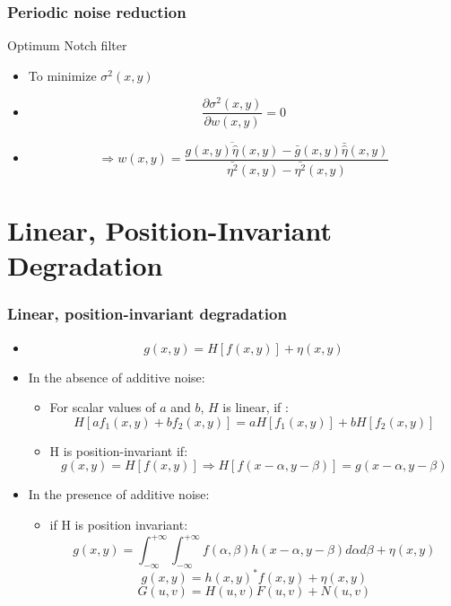 \documentclass{beamer}
\begin{document}
\begin{frame}
\frametitle{Periodic noise reduction}
\begin{block}{Optimum Notch filter}
\begin{itemize}
\item To minimize $\sigma^2(x,y)$
\item[] $$\frac{\partial \sigma^2 (x,y)}{\partial w(x,y)} = 0 $$ 
\item[] $$\Rightarrow w(x,y) = \frac{\overline{g(x,y)\hat{\eta}(x,y)} - \bar{g}(x,y)\bar{\hat{\eta}}(x,y)}{\bar{\eta^2}(x,y) - \bar{\eta^2}(x,y)}$$
\end{itemize}
\end{block}
\end{frame}
\section{Linear, Position-Invariant Degradation}
\begin{frame}
\frametitle{Linear, position-invariant degradation}
\begin{itemize}
	\item[] $$g(x,y) = H[f(x,y)]+\eta(x,y)$$
	\item In the absence of additive noise:
	\begin{itemize}
	\item For scalar values of $a$ and $b$, $H$ is linear, if : 
	$$H[af_{1}(x,y)+bf_{2}(x,y)] = aH[f_{1}(x,y)]+bH[f_{2}(x,y)] $$ 
	\item H is position-invariant if:
	$$ g(x,y) = H[f(x,y)] \Rightarrow H[f(x-\alpha, y-\beta)] = g(x-\alpha, y-\beta)$$	
	\end{itemize}
	\item In the presence of additive noise:
	\begin{itemize}
	\item if H is position invariant: 
	\scriptsize{
	$$ g(x,y) = \int_{-\infty}^{+\infty}\int_{-\infty}^{+\infty} f(\alpha, \beta)h(x-\alpha,y-\beta)d\alpha d\beta +\eta(x,y)$$
	$$ g(x,y) = h(x,y)^{\ast} f(x,y)+\eta(x,y)$$
	$$ G(u,v) = H(u,v)F(u,v)+N(u,v)$$
	}
	\end{itemize}				
\end{itemize}
\end{frame}
\end{document}
